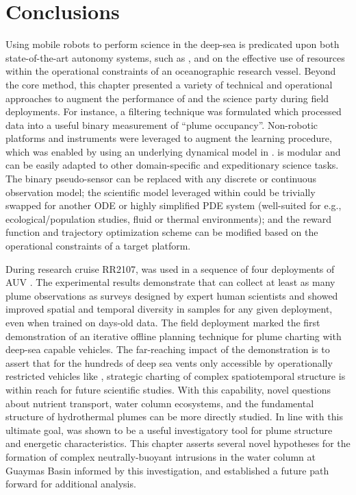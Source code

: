 \section{Conclusions}
\label{sec:field_conclusion}
Using mobile robots to perform science in the deep-sea is predicated upon both state-of-the-art autonomy systems, such as \PHORTEX, and on the effective use of resources within the operational constraints of an oceanographic research vessel. Beyond the core \PHORTEX method, this chapter presented a variety of technical and operational approaches to augment the performance of \PHORTEX and the science party during field deployments. For instance, a filtering technique was formulated which processed \Sentry data into a useful binary measurement of ``plume occupancy''. Non-robotic platforms and instruments were leveraged to augment the \PHUMES learning procedure, which was enabled by using an underlying dynamical model in \PHUMES. \PHORTEX is modular and can be easily adapted to other domain-specific and expeditionary science tasks. The binary pseudo-sensor can be replaced with any discrete or continuous observation model; the scientific model leveraged within \PHUMES could be trivially swapped for another ODE or highly simplified PDE system (well-suited for e.g., ecological/population studies, fluid or thermal environments); and the reward function and trajectory optimization scheme can be modified based on the operational constraints of a target platform.

During research cruise RR2107, \PHORTEX was used in a sequence of four deployments of AUV \Sentry. The experimental results demonstrate that \PHORTEX can collect at least as many plume observations as surveys designed by expert human scientists and showed improved spatial and temporal diversity in samples for any given deployment, even when trained on days-old data. The field deployment marked the first demonstration of an iterative offline planning technique for plume charting with deep-sea capable vehicles. The far-reaching impact of the demonstration is to assert that for the hundreds of deep sea vents only accessible by operationally restricted vehicles like \Sentry, strategic charting of complex spatiotemporal structure is within reach for future scientific studies. With this capability, novel questions about nutrient transport, water column ecosystems, and the fundamental structure of hydrothermal plumes can be more directly studied. In line with this ultimate goal, \PHUMES was shown to be a useful investigatory tool for plume structure and energetic characteristics. This chapter asserts several novel hypotheses for the formation of complex neutrally-buoyant intrusions in the water column at Guaymas Basin informed by this investigation, and established a future path forward for additional analysis.
 
